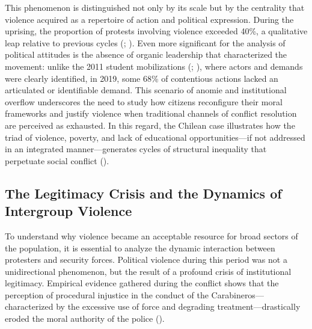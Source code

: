 \documentclass[
  13pt,
]{article}
\begin{document}
This phenomenon is distinguished not only by its scale but by the
centrality that violence acquired as a repertoire of action and
political expression. During the uprising, the proportion of protests
involving violence exceeded 40\%, a qualitative leap relative to
previous cycles (; ).
Even more significant for the analysis of political attitudes is the
absence of organic leadership that characterized the movement: unlike
the 2011 student mobilizations
(;
), where actors
and demands were clearly identified, in 2019, some 68\% of contentious
actions lacked an articulated or identifiable demand. This scenario of
anomie and institutional overflow underscores the need to study how
citizens reconfigure their moral frameworks and justify violence when
traditional channels of conflict resolution are perceived as exhausted.
In this regard, the Chilean case illustrates how the triad of violence,
poverty, and lack of educational opportunities---if not addressed in an
integrated manner---generates cycles of structural inequality that
perpetuate social conflict ().

\subsection{The Legitimacy Crisis and the Dynamics of Intergroup
Violence}\label{the-legitimacy-crisis-and-the-dynamics-of-intergroup-violence}

To understand why violence became an acceptable resource for broad
sectors of the population, it is essential to analyze the dynamic
interaction between protesters and security forces. Political violence
during this period was not a unidirectional phenomenon, but the result
of a profound crisis of institutional legitimacy. Empirical evidence
gathered during the conflict shows that the perception of procedural
injustice in the conduct of the Carabineros---characterized by the
excessive use of force and degrading treatment---drastically eroded the
moral authority of the police
().
\end{document}
